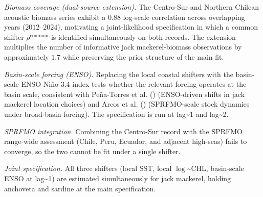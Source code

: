 \documentclass[
  11pt,
]{article}
\begin{document}
\emph{Biomass coverage (dual-source extension).} The Centro-Sur and
Northern Chilean acoustic biomass series exhibit a \(0.88\) log-scale
correlation across overlapping years (\(2012\)--\(2024\)), motivating a
joint-likelihood specification in which a common shifter
\(\rho^{\text{common}}\) is identified simultaneously on both records.
The extension multiplies the number of informative jack mackerel-biomass
observations by approximately \(1.7\) while preserving the prior
structure of the main fit.

\emph{Basin-scale forcing (ENSO).} Replacing the local coastal shifters
with the basin-scale ENSO Niño 3.4 index tests whether the relevant
forcing operates at the basin scale, consistent with
Peña-Torres et al. () (ENSO-driven shifts in jack mackerel location
choices) and Arcos et al. () (SPRFMO-scale stock dynamics under
broad-basin forcing). The specification is run at lag\textasciitilde1 and lag\textasciitilde2.

\emph{SPRFMO integration.} Combining the Centro-Sur record with the
SPRFMO range-wide assessment (Chile, Peru, Ecuador, and adjacent
high-seas) fails to converge, so the two cannot be fit under a single
shifter.

\emph{Joint specification.} All three shifters (local SST, local
\(\log\)\textasciitilde CHL, basin-scale ENSO at lag\textasciitilde1) are estimated simultaneously
for jack mackerel, holding anchoveta and sardine at the main
specification.
\end{document}
